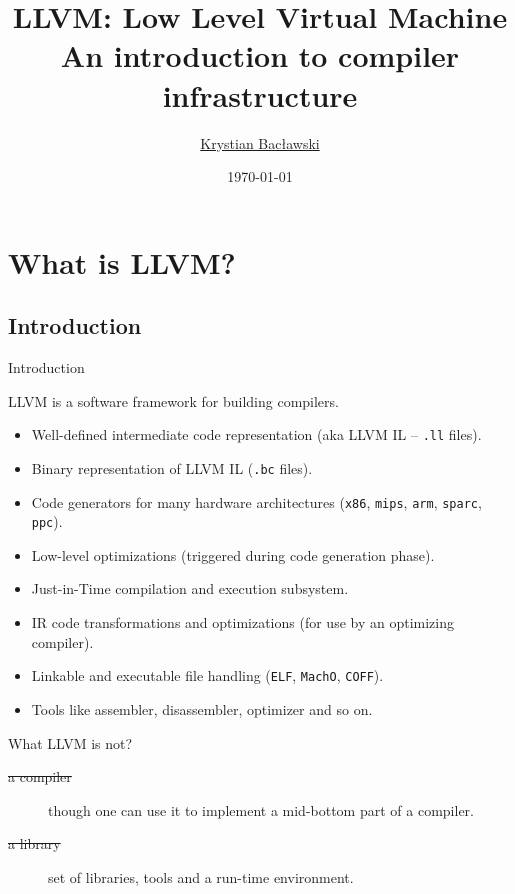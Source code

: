 \documentclass[8pt]{beamer}
\title[LLVM]{LLVM: Low Level Virtual Machine\\An introduction to compiler infrastructure}
\author[Krystian Bacławski]{\href{mailto:cahirwpz@cs.uni.wroc.pl}{Krystian Bacławski}}
\institute{Computer Science Department\\University of Wrocław}
\date{\today}
\begin{document}
\begin{frame}
\titlepage
\end{frame}

\section[Introduction]{What is LLVM?}
\subsection*{Introduction}

\begin{frame}[fragile]{Introduction}
  \begin{block}{LLVM is a software framework for building compilers.}
    \begin{itemize}
      \item Well-defined intermediate code representation (aka LLVM IL -- \verb+.ll+ files).
      \item Binary representation of LLVM IL (\verb+.bc+ files).
      \item Code generators for many hardware architectures (\verb+x86+,
        \verb+mips+, \verb+arm+, \verb+sparc+, \verb+ppc+).
      \item Low-level optimizations (triggered during code generation phase).
      \item Just-in-Time compilation and execution subsystem.
      \item IR code transformations and optimizations (for use by an optimizing compiler).
      \item Linkable and executable file handling (\verb+ELF+, \verb+MachO+, \verb+COFF+).
      \item Tools like assembler, disassembler, optimizer and so on.
    \end{itemize}
  \end{block}

  \begin{block}{What LLVM is not?}
    \begin{description}
      \item[\sout{a compiler}] though one can use it to implement a mid-bottom part of a compiler.
      \item[\sout{a library}] set of libraries, tools and a run-time environment.
    \end{description}
  \end{block}
\end{frame}
\end{document}
